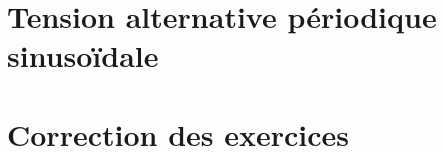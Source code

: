 \documentclass[12pt,a4paper]{article}
\begin{document}
\section{Tension alternative périodique sinusoïdale}



%




%		
\appendix

\newpage

\section*{Correction des exercices}
\end{document}
